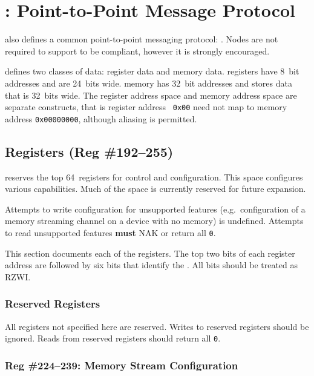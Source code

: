 \section{\proto: Point-to-Point Message Protocol}
\bus also defines a common point-to-point messaging protocol: \proto.
Nodes are not required to support \proto to be \bus compliant, however it is
strongly encouraged.

\proto defines two classes of data: register data and memory data. \proto
registers have 8~bit addresses and are 24~bits wide. \proto memory has 32~bit
addresses and stores data that is 32~bits wide. The register address space and
memory address space are separate constructs, that is register address {\tt
0x00} need not map to memory address {\tt 0x00000000}, although aliasing is
permitted.

\subsection{\proto Registers (Reg \#192--255)}
\label{cmd:conf}
\proto reserves the top 64~registers for control and configuration. This space
configures various \proto capabilities. Much of the space is currently
reserved for future expansion.

Attempts to write configuration for unsupported features (e.g.\ configuration
of a memory streaming channel on a device with no memory) is undefined.
Attempts to read unsupported features {\bf must} NAK or return all {\tt 0}.

This section documents each of the registers. The top two bits of each
register address are  followed by six bits that
identify the . All 
bits should be treated as RZWI.

\subsubsection{Reserved Registers}
All registers not specified here are reserved.
Writes to reserved registers should be ignored. Reads from reserved registers
should return all {\tt 0}.


\subsubsection{Reg \#224--239: Memory Stream Configuration}
\label{cmd:conf-memory-stream}

